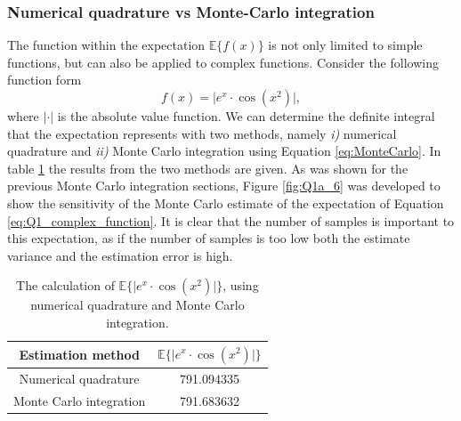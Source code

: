 \documentclass{article}
\begin{document}
\subsubsection{Numerical quadrature vs Monte-Carlo integration}
The function within the expectation $\mathbb{E}\{ f(x) \}$ is not only limited to simple functions, but can also be applied to complex functions. Consider the following function form
\begin{equation}\label{eq:Q1_complex_function}
    f(x) = \vert e^x \cdot \cos \left( x^2 \right) \vert,
\end{equation}
where $\vert \cdot \vert$ is the absolute value function. We can determine the definite integral that the expectation represents with two methods, namely \emph{i)} numerical quadrature and \emph{ii)} Monte Carlo integration using Equation \eqref{eq:MonteCarlo}. In table \ref{tab:complex_expectations} the results from the two methods are given. As was shown for the previous Monte Carlo integration sections, Figure \ref{fig:Q1a_6} was developed to show the sensitivity of the Monte Carlo estimate of the expectation of Equation \eqref{eq:Q1_complex_function}. It is clear that the number of samples is important to this expectation, as if the number of samples is too low both the estimate variance and the estimation error is high.
\begin{table}[!htb]
\centering
\caption{The calculation of $\mathbb{E}\{ \vert e^x \cdot \cos \left( x^2 \right) \vert\}$, using numerical quadrature and Monte Carlo integration.}
\label{tab:complex_expectations}
\begin{tabular}{@{}cc@{}}
\toprule
Estimation method & $\mathbb{E}\{ \vert e^x \cdot \cos \left( x^2 \right) \vert\}$ \\ \midrule
Numerical quadrature & 791.094335 \\
Monte Carlo integration & 791.683632 \\ \bottomrule
\end{tabular}
\end{table}
\end{document}
